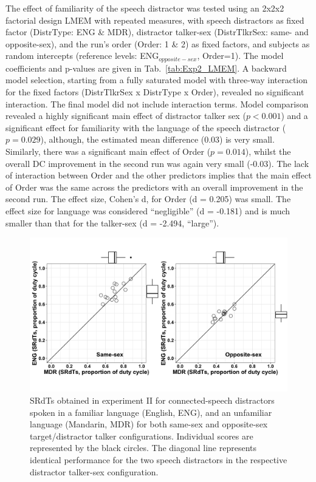 \documentclass[a4paper, twoside]{templates/ociamthesis}
\begin{document}
The effect of familiarity of the speech distractor was tested using an 2x2x2 factorial design LMEM with repeated measures, with speech distractors as fixed factor (DistrType: ENG \& MDR), distractor talker-sex (DistrTlkrSex: same- and opposite-sex), and the run's order (Order: 1 \& 2) as fixed factors, and subjects as random intercepts (reference levels: ENG\(_{opposite-sex}\), Order=1). The model coefficients and p-values are given in Tab.~\ref{tab:Exp2_LMEM}. A backward model selection, starting from a fully saturated model with three-way interaction for the fixed factors (DistrTlkrSex x DistrType x Order), revealed no significant interaction. The final model did not include interaction terms. Model comparison revealed a highly significant main effect of distractor talker sex (\(p<0.001\)) and a significant effect for familiarity with the language of the speech distractor (\(p=0.029\)), although, the estimated mean difference (0.03) is very small. Similarly, there was a significant main effect of Order (\(p=0.014\)), whilst the overall DC improvement in the second run was again very small (-0.03). The lack of interaction between Order and the other predictors implies that the main effect of Order was the same across the predictors with an overall improvement in the second run. The effect size, Cohen's d, for Order (d = 0.205) was small. The effect size for language was considered ``negligible'' (d = -0.181) and is much smaller than that for the talker-sex (d = -2.494, ``large'').\\

\begin{figure}[ht]
\center
\includegraphics[width=\textwidth]{figures/Chapt1/Exp2_ENG_vs_MDR.PNG}
\caption{\label{fig:ENG_vs_MDR}{SRdTs obtained in experiment II for connected-speech distractors spoken in a familiar language (English, ENG), and an unfamiliar language (Mandarin, MDR) for both same-sex and opposite-sex target/distractor talker configurations. Individual scores are represented by the black circles. The diagonal line represents identical performance for the two speech distractors in the respective distractor talker-sex configuration.}}
\end{figure}
\end{document}
